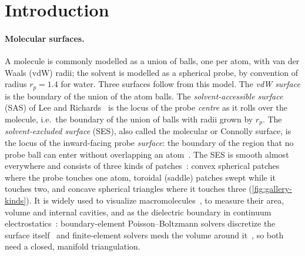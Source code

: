 
\section{Introduction}
\label{sec:intro}

\paragraph{Molecular surfaces.}
A molecule is commonly modelled as a union of balls, one per atom, with van
der Waals (vdW) radii; the solvent is modelled as a spherical probe, by
convention of radius $r_p = 1.4$\Ang{} for water. Three surfaces follow from
this model. The \emph{vdW surface} is the boundary of the union of the atom
balls. The \emph{solvent-accessible surface} (SAS) of Lee and
Richards~\cite{lee1971} is the locus of the probe \emph{centre} as it rolls
over the molecule, i.e.\ the boundary of the union of balls with radii
grown by $r_p$. The \emph{solvent-excluded surface} (SES), also called the
molecular or Connolly surface, is the locus of the inward-facing probe
\emph{surface}: the boundary of the region that no probe ball can enter
without overlapping an atom~\cite{richards1977,greer1978,connolly1983jac,connolly1983science}.
The SES is smooth almost everywhere and consists of three kinds of
patches~\cite{connolly1983jac}: convex spherical patches where the probe
touches one atom, toroidal (saddle) patches swept while it touches two, and
concave spherical triangles where it touches three
(\cref{fig:gallery-kinds}). It is widely used to visualize
macromolecules~\cite{kozlikova2017}, to measure their area, volume and
internal cavities, and as the dielectric boundary in continuum
electrostatics~\cite{lu2008pbreview}: boundary-element Poisson--Boltzmann
solvers discretize the surface
itself~\cite{lu2010afmpb,geng2013tabipb,cooper2014pygbe} and
finite-element solvers mesh the volume around
it~\cite{holst2000fem,yu2008gamer}, so both need a closed, manifold
triangulation.

